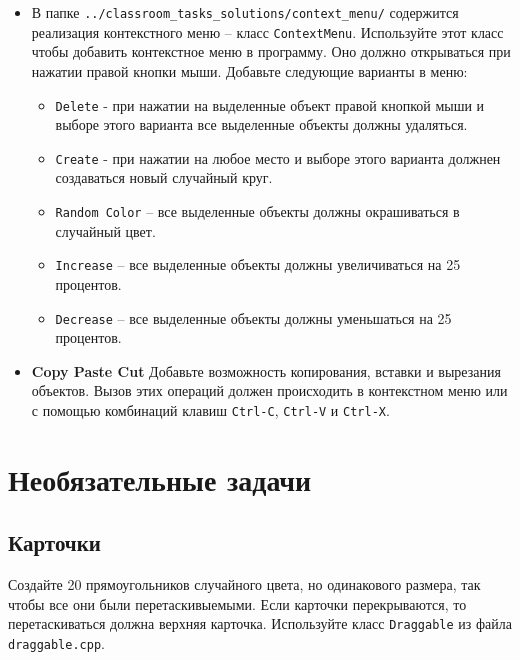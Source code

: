 \documentclass{article}
\begin{document}
\begin{itemize}
\item В папке \texttt{../classroom\_tasks\_solutions/context\_menu/} содержится реализация контекстного меню -- класс \texttt{ContextMenu}. Используйте этот класс чтобы добавить контекстное меню в программу. Оно должно открываться при нажатии правой кнопки мыши. Добавьте следующие варианты в меню:
\begin{itemize}
\item \texttt{Delete} - при нажатии на выделенные объект правой кнопкой мыши и выборе этого варианта все выделенные объекты должны удаляться.
\item \texttt{Create} - при нажатии на любое место и выборе этого варианта должнен создаваться новый случайный круг.
\item \texttt{Random Color} -- все выделенные объекты должны окрашиваться в случайный цвет.
\item \texttt{Increase} -- все выделенные объекты должны увеличиваться на 25 процентов.
\item \texttt{Decrease} -- все выделенные объекты должны уменьшаться на 25 процентов.
\end{itemize}

\item \textbf{Copy Paste Cut} Добавьте возможность копирования, вставки и вырезания объектов. Вызов этих операций должен происходить в контекстном меню или с помощью комбинаций клавиш \texttt{Ctrl-C}, \texttt{Ctrl-V} и \texttt{Ctrl-X}.

\end{itemize}



\section{Необязательные задачи}

\subsection{Карточки} 
Создайте 20 прямоугольников случайного цвета, но одинакового размера, так чтобы все они были перетаскивыемыми. Если карточки перекрываются, то перетаскиваться должна верхняя карточка. Используйте класс \texttt{Draggable} из файла \texttt{draggable.cpp}.
	
\end{document}
